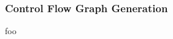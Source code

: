 
\subsubsection{Control Flow Graph Generation}
\label{sec:design_control_flow_graph_generation}


foo
